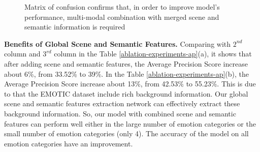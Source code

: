 \documentclass[conference]{IEEEtran}
\begin{document}
\begin{figure*}[htbp]
\centering
{}%
%
%
\centering
\caption{Matrix of confusion confirms that, in order to improve model's performance,  multi-modal combination with merged scene and semantic information is required}
 \label{newdata_confusion_matrix}
\end{figure*}
%
\textbf{Benefits of Global Scene and Semantic Features.} 
Comparing with $2^{nd}$ column and $3^{rd}$ column in the Table \ref{ablation-experiments-ap}(a), it shows that after adding scene and semantic features, the Average Precision Score increase about 6\%, from 33.52\% to 39\%. In the Table \ref{ablation-experiments-ap}(b), the Average Precision Score increase about 13\%, from 42.53\% to 55.23\%.  This is due to that the EMOTIC dataset include rich background information. Our global scene and semantic features extraction network can effectively extract these background information. So, our model with combined scene and semantic features can perform well either in the large number of emotion categories or the small number of emotion categories (only 4). The accuracy of the model on all emotion categories have an improvement. 
\end{document}

